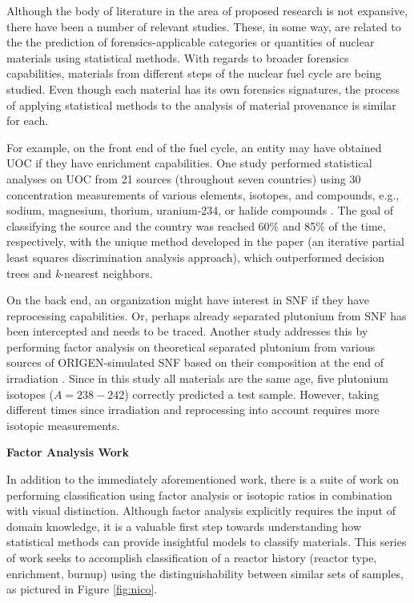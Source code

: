 
Although the body of literature in the area of proposed research is not
expansive, there have been a number of relevant studies. These, in some way,
are related to the the prediction of forensics-applicable categories or
quantities of nuclear materials using statistical methods.  With regards to
broader forensics capabilities, materials from different steps of the nuclear
fuel cycle are being studied.  Even though each material has its own forensics
signatures, the process of applying statistical methods to the analysis of
material provenance is similar for each. 

For example, on the front end of the fuel cycle, an entity may have obtained
\gls{UOC} if they have enrichment capabilities.  One study performed
statistical analyses on \gls{UOC} from 21 sources (throughout seven countries)
using 30 concentration measurements of various elements, isotopes, and
compounds, e.g., sodium, magnesium, thorium, uranium-234, or halide compounds
\cite{robel_2009}.  The goal of classifying the source and the country was
reached 60\% and 85\% of the time, respectively, with the unique method
developed in the paper (an iterative partial least squares discrimination
analysis approach), which outperformed decision trees and \textit{k}-nearest
neighbors.

On the back end, an organization might have interest in \gls{SNF} if they have
reprocessing capabilities.  Or, perhaps already separated plutonium from
\gls{SNF} has been intercepted and needs to be traced. Another study addresses
this by performing factor analysis on theoretical separated plutonium from
various sources of \gls{ORIGEN}-simulated \gls{SNF} based on their composition
at the end of irradiation \cite{nicolaou_pu}.  Since in this study all
materials are the same age, five plutonium isotopes ($A = 238-242$) correctly
predicted a test sample. However, taking different times since irradiation and
reprocessing into account requires more isotopic measurements. 

\noindent \textbf{Factor Analysis Work}

In addition to the immediately aforementioned work, there is a suite of work on
performing classification using factor analysis or isotopic ratios in
combination with visual distinction.  Although factor analysis explicitly
requires the input of domain knowledge, it is a valuable first step towards
understanding how statistical methods can provide insightful models to classify
materials.  This series of work seeks to accomplish classification of a reactor
history (reactor type, enrichment, burnup) using the distinguishability between
similar sets of samples, as pictured in Figure \ref{fig:nico}.

